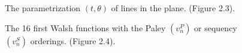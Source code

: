 \documentclass[10pt,english,a4paper]{article}
\begin{document}
\begin{figure}
\centering
\begin{tikzpicture}[scale=0.85]
    
\end{tikzpicture}
    \caption{The parametrization $(t, \theta)$
of lines in the plane. (Figure 2.3).}
\end{figure}    

\begin{figure}
\centering
\begin{tikzpicture}[scale=0.85]
    
\end{tikzpicture}
    \caption{The 16 first Walsh functions 
with the Paley $(v_{n}^{P})$ or sequency $(v_{n}^{S})$ orderings.
(Figure 2.4).}
\end{figure}    
\end{document}
